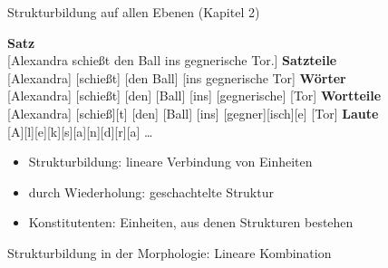\begin{frame}
  {Strukturbildung auf allen Ebenen (Kapitel 2)}
  \pause
  \begin{exe}
    \ex\label{ex:strukturbildung021}
    \begin{xlist}
      \ex \textbf{Satz} \\
      {[Alexandra schießt den Ball ins gegnerische Tor.]}
      \pause
      \ex \textbf{Satzteile} \\
      {[Alexandra] [schießt] [den Ball] [ins gegnerische Tor]}
      \pause
      \ex \textbf{Wörter} \\
      {[Alexandra] [schießt] [den] [Ball] [ins] [gegnerische] [Tor]}
      \pause
      \ex \textbf{Wortteile} \\
      {[Alexandra] [schieß][t] [den] [Ball] [ins] [gegner][isch][e] [Tor]}
      \pause
      \ex \textbf{Laute} \\
      {[A][l][e][k][s][a][n][d][r][a] \ldots \\}
    \end{xlist}
  \end{exe}
  \pause
  \Halbzeile
  \begin{itemize}[<+->]
    \item Strukturbildung: lineare Verbindung von Einheiten
    \item durch Wiederholung: \alert{geschachtelte} Struktur
    \item \alert{Konstitutenten}: Einheiten, aus denen Strukturen bestehen
  \end{itemize}
\end{frame}

\begin{frame}
  {Strukturbildung in der Morphologie: Lineare Kombination}
  \pause
  \begin{exe}
    \ex
    \begin{xlist}
      \pause
    \end{xlist}
    \pause
    \ex
    \begin{xlist}
      \pause
    \end{xlist}
    \pause
  \end{exe}
\end{frame}

